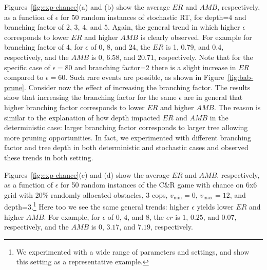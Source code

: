 \documentclass[runningheads]{llncs}
\newcommand{\vmax}{v_{\text{max}}}
\newcommand{\vmin}{v_{\text{min}}}
\newcommand{\amb}{\mathit{AMB}}
\newcommand{\er}{\mathit{ER}}
\begin{document}
Figures~\ref{fig:exp-chance}(a) and (b) show the average $\er$ and $\amb$, respectively, as a function of $\epsilon$ for 50 random instances of stochastic RT, for depth=$4$ and branching factor of $2$, $3$, $4$, and $5$. Again, the general trend in which higher $\epsilon$ corresponds to lower $\er$ and higher $\amb$ is clearly observed. For example for branching factor of 4, for $\epsilon$ of 0, 8, and 24, the $\er$ is 1, 0.79, and 0.4, respectively, and the $\amb$ is 0, 6.58, and 20.71, respectively.
Note that for the specific case of $\epsilon=80$ and branching factor=2 there is a slight increase in $\er$ compared to $\epsilon=60$. Such rare events are possible, as shown in Figure~\ref{fig:bab-prune}. 
Consider now the effect of increasing the branching factor. The results show that increasing the branching factor for the same $\epsilon$ are in general that higher branching factor corresponds to lower $\er$ and higher $\amb$. The reason is similar to the explanation of how depth impacted $\er$ and $\amb$ in the deterministic case: larger branching factor corresponds to larger tree allowing more pruning opportunities. 
In fact, we experimented with different branching factor and tree depth in both deterministic and stochastic cases and observed these trends in both setting. 

Figures~\ref{fig:exp-chance}(c) and (d) show the average $\er$ and $\amb$, respectively, as a function of $\epsilon$ for 50 random instances of the C\&R game with chance on 6x6 grid with 20\% randomly allocated obstacles, 3 cops, $\vmin=0$, $\vmax=12$, and depth=$3$.\footnote{We experimented with a wide range of parameters and settings, and show this setting as a representative example.} Here too we see the same general trends: higher $\epsilon$ yields lower $\er$ and higher $\amb$. For example, for $\epsilon$ of $0$, $4$, and $8$, the $er$ is $1$, $0.25$, and $0.07$, respectively, and the $\amb$ is $0$, $3.17$, and $7.19$, respectively.
\end{document}
